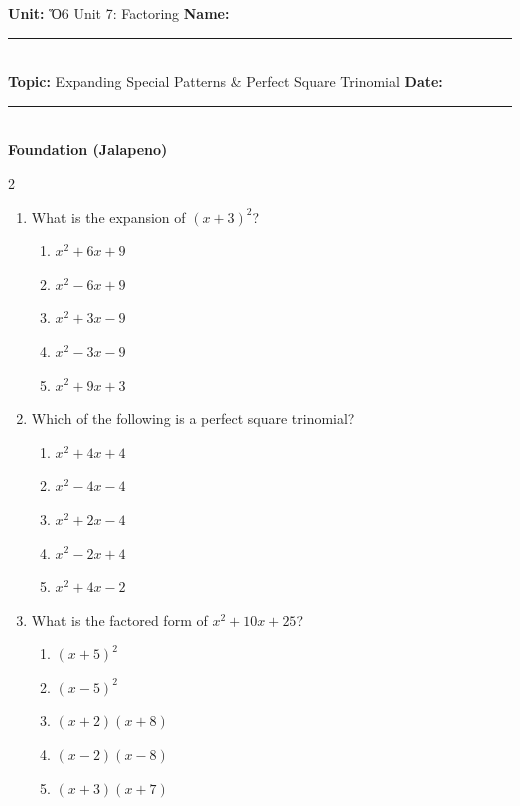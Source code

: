 \documentclass[10pt]{article}
\begin{document}
\enlargethispage{2.5cm}

\begin{tcolorbox}[colback=mainblue!5, colframe=mainblue, sharp corners, boxrule=0.5pt]
    \small \textbf{Unit:} Ὅ6 Unit 7: Factoring \hfill \textbf{Name:} \rule{3cm}{0.4pt} \\
    \small \textbf{Topic:} Expanding Special Patterns & Perfect Square Trinomial \hfill \textbf{Date:} \rule{2cm}{0.4pt} \\
    \centering \textbf{\large Foundation (Jalapeno)}
\end{tcolorbox}

\vspace{0.2cm}

\begin{multicols}{2}
\begin{enumerate}[label=\textbf{Q\arabic*.}, leftmargin=*, itemsep=6pt, parsep=0pt]

  \item \small What is the expansion of $(x + 3)^2$?
  \begin{enumerate}[label=(\Alph*), leftmargin=0.6cm, nosep, itemsep=2pt]
    \item $x^2 + 6x + 9$
    \item $x^2 - 6x + 9$
    \item $x^2 + 3x - 9$
    \item $x^2 - 3x - 9$
    \item $x^2 + 9x + 3$
  \end{enumerate}

  \item \small Which of the following is a perfect square trinomial?
  \begin{enumerate}[label=(\Alph*), leftmargin=0.6cm, nosep, itemsep=2pt]
    \item $x^2 + 4x + 4$
    \item $x^2 - 4x - 4$
    \item $x^2 + 2x - 4$
    \item $x^2 - 2x + 4$
    \item $x^2 + 4x - 2$
  \end{enumerate}

  \item \small What is the factored form of $x^2 + 10x + 25$?
  \begin{enumerate}[label=(\Alph*), leftmargin=0.6cm, nosep, itemsep=2pt]
    \item $(x + 5)^2$
    \item $(x - 5)^2$
    \item $(x + 2)(x + 8)$
    \item $(x - 2)(x - 8)$
    \item $(x + 3)(x + 7)$
  \end{enumerate}


\end{enumerate}
\end{multicols}
\end{document}
